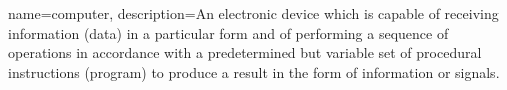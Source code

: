  {
	name={computer}, 
	description={An electronic device which is capable of receiving information (data) in a particular form and of performing a sequence of operations in accordance with a predetermined but variable set of procedural instructions (program) to produce a result in the form of information or signals.
}
}
